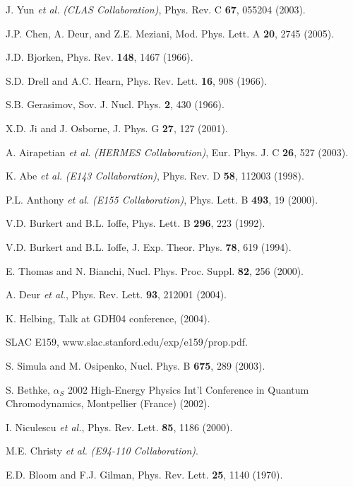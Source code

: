 \begin{thebibliography}{199}
J. Yun {\it et al.} {\it (CLAS Collaboration)}, Phys. Rev. C {\bf 67},
055204 (2003).

J.P. Chen, A. Deur, and Z.E. Meziani, Mod. Phys. Lett. A {\bf 20},
2745 (2005).

J.D. Bjorken, Phys. Rev. {\bf 148}, 1467 (1966).

S.D. Drell and A.C. Hearn, Phys. Rev. Lett. {\bf 16}, 908 (1966).

S.B. Gerasimov, Sov. J. Nucl. Phys. {\bf 2}, 430 (1966).

X.D. Ji and J. Osborne, J. Phys. G {\bf 27}, 127 (2001).

A. Airapetian {\it et al.} {\it (HERMES Collaboration)}, Eur. Phys. J. 
C {\bf 26}, 527 (2003).

K. Abe {\it et al.} {\it (E143 Collaboration)}, Phys. Rev. D {\bf 58},
112003 (1998).

P.L. Anthony {\it et al.} {\it (E155 Collaboration)}, Phys. Lett. B
{\bf 493}, 19 (2000).

V.D. Burkert and B.L. Ioffe, Phys. Lett. B {\bf 296}, 223 (1992).

V.D. Burkert and B.L. Ioffe, J. Exp. Theor. Phys. {\bf 78}, 619 (1994).

E. Thomas and N. Bianchi, Nucl. Phys. Proc. Suppl. {\bf 82}, 256 (2000).

A. Deur {\it et al.}, Phys. Rev. Lett. {\bf 93}, 212001 (2004).

K. Helbing, Talk at GDH04 conference, (2004).

SLAC E159, www.slac.stanford.edu/exp/e159/prop.pdf.

S. Simula and M. Osipenko, Nucl. Phys. B {\bf 675}, 289 (2003).

S. Bethke, $\alpha_S$ 2002 High-Energy Physics Int'l Conference in 
Quantum Chromodynamics, Montpellier (France)  (2002).

I. Niculescu {\it et al.}, Phys. Rev. Lett. {\bf 85}, 1186 (2000).

M.E. Christy {\it et al.} {\it (E94-110 Collaboration)}. 

E.D. Bloom and F.J. Gilman, Phys. Rev. Lett. {\bf 25}, 1140 (1970).


\end{thebibliography}

